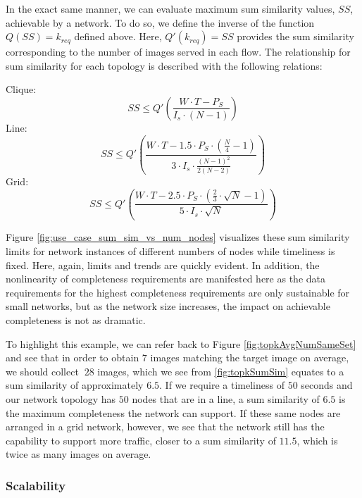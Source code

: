 In the exact same manner, we can evaluate maximum sum similarity values, $SS$, achievable by a network.  To do so, we define the inverse of the function $Q(SS) = k_{req}$ defined above.  Here, $Q'(k_{req}) = SS$ provides the sum similarity corresponding to the number of images served in each flow.  The relationship for sum similarity for each topology is described with the following relations:

\vspace{4mm}
\noindent
Clique:
\begin{equation}
	SS \leq Q'( \frac{W \cdot T - P_S}{I_s \cdot (N-1)} )
\end{equation}
Line:
\begin{equation}
	SS \leq Q'( \frac{W \cdot T - 1.5 \cdot P_S \cdot (\frac{N}{4} - 1)}{3 \cdot I_s \cdot \frac{(N-1)^2}{2(N-2)}} )
\end{equation}
Grid:
\begin{equation}
	SS \leq Q'( \frac{W \cdot T - 2.5 \cdot P_S \cdot (\frac{2}{3} \cdot \sqrt{N} - 1)}{5 \cdot I_s \cdot \sqrt{N}} )
\end{equation}

Figure \ref{fig:use_case_sum_sim_vs_num_nodes} visualizes these sum similarity limits for network instances of different numbers of nodes while timeliness is fixed.  Here, again, limits and trends are quickly evident.  In addition, the nonlinearity of completeness requirements are manifested here as the data requirements for the highest completeness requirements are only sustainable for small networks, but as the network size increases, the impact on achievable completeness is not as dramatic.  

To highlight this example, we can refer back to Figure \ref{fig:topkAvgNumSameSet} and see that in order to obtain $7$ images matching the target image on average, we should collect $~28$ images, which we see from \ref{fig:topkSumSim} equates to a sum similarity of approximately $6.5$.  If we require a timeliness of $50$ seconds and our network topology has $50$ nodes that are in a line, a sum similarity of $6.5$ is the maximum completeness the network can support.  If these same nodes are arranged in a grid network, however, we see that the network still has the capability to support more traffic, closer to a sum similarity of $11.5$, which is twice as many images on average.
 
\subsubsection{Scalability}

